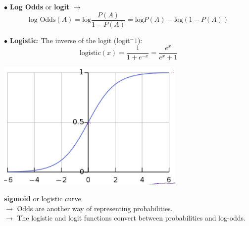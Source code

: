 \documentclass[letterpaper, 10.5pt,landscape]{article}
\begin{document}
\begin{multicols*}{3}
\vspace{3pt}
$\bullet$ \textbf{Log Odds} or \textbf{logit} $\rightarrow$
\vspace{-7pt}
\[\text{log Odds}(A) = \text{log} \frac{P(A)}{1-P(A)} = \text{log}P(A) - \text{log}\left(1-P(A) \right) \]
\vspace{-7pt}

\vspace{3pt}
$\bullet$ \textbf{Logistic}: The inverse of the logit (logit$^-1$): 
\vspace{-3pt}
\[\boxed{\text{logistic}(x) = \frac{1}{1+e^{-x}} = \frac{e^{x}}{e^{x} +1} }\]

\vspace{-3pt}


\begin{minipage}{0.5\linewidth}
    \centering
    \includegraphics[width=\textwidth]{figures/Logistics_sigmoid_curve.PNG}
\end{minipage}
\textbf{sigmoid} or logistic curve. \\

\vspace{3pt}
$\rightarrow$ Odds are another way of representing probabilities.\\
$\rightarrow$ The logistic and logit functions convert between probabilities and log-odds. \\




\end{multicols*}
\end{document}
